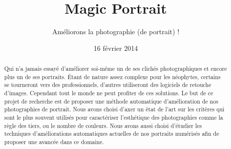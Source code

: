\documentclass[11pt, french,screen]{report-rd-info}
\begin{document}
\title{Magic Portrait}
\subtitle{Améliorons la photographie (de portrait) !}
\date{16 février 2014}
\begin{abstract}
Qui n'a jamais essayé d'améliorer soi-même un de ses clichés photographiques et encore plus un de ses portraits. Étant de nature assez complexe pour les néophytes, certains se tourneront vers des professionnels, d'autres utiliseront des logiciels de retouche d'images. Cependant tout le monde ne peut profiter de ces solutions.  Le but de ce projet de recherche est de proposer une méthode automatique d'amélioration de nos photographies de portrait. Nous avons choisi d'axer un état de l'art sur les critères qui sont le plus souvent utilisés pour caractériser l'esthétique des photographies comme la règle des tiers, ou le nombre de couleurs. Nous avons aussi choisi d'étudier les techniques d'améliorations automatiques actuelles de nos portraits numérisés afin de proposer une avancée dans ce domaine.
\end{abstract}
\end{document}
